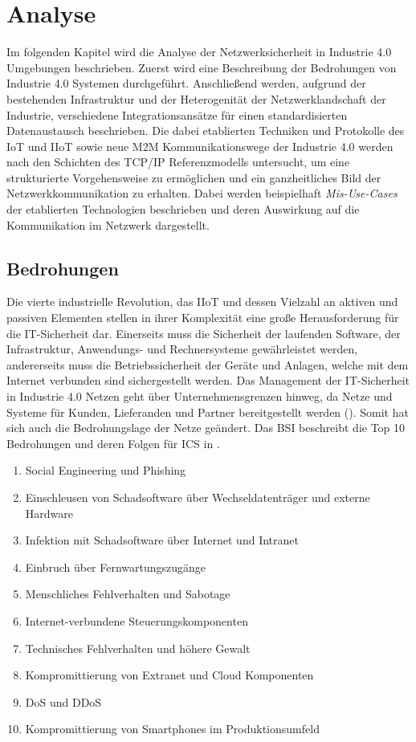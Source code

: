 \chapter{Analyse}
\label{Analyse}
Im folgenden Kapitel wird die Analyse der Netzwerksicherheit in Industrie 4.0 Umgebungen beschrieben. Zuerst wird eine Beschreibung der Bedrohungen von Industrie 4.0 Systemen durchgeführt. Anschließend werden, aufgrund der bestehenden Infrastruktur und der Heterogenität der Netzwerklandschaft der Industrie, verschiedene Integrationsansätze für einen standardisierten Datenaustausch beschrieben. Die dabei etablierten Techniken und Protokolle des \ac{IoT} und \ac{IIoT} sowie neue \ac{M2M} Kommunikationswege der Industrie 4.0 werden nach den Schichten des \ac{TCP}/\ac{IP} Referenzmodells untersucht, um eine strukturierte Vorgehensweise zu ermöglichen und ein ganzheitliches Bild der Netzwerkkommunikation zu erhalten. Dabei werden beispielhaft \textit{Mis-Use-Cases} der etablierten Technologien beschrieben und deren Auswirkung auf die Kommunikation im Netzwerk dargestellt.

\section{Bedrohungen}
\label{Analyse:Bedrohungen}
Die vierte industrielle Revolution, das \ac{IIoT} und dessen Vielzahl an aktiven und passiven Elementen stellen in ihrer Komplexität eine große Herausforderung für die IT-Sicherheit dar. Einerseits muss die Sicherheit der laufenden Software, der Infrastruktur, Anwendungs- und Rechnersysteme gewährleistet werden, andererseits muss die Betriebssicherheit der Geräte und Anlagen, welche mit dem Internet verbunden sind sichergestellt werden. Das Management der IT-Sicherheit in Industrie 4.0 Netzen geht über Unternehmensgrenzen hinweg, da Netze und Systeme für Kunden, Lieferanden und Partner bereitgestellt werden (\cite{DTAG2016}). Somit hat sich auch die Bedrohungslage der Netze geändert. Das \ac{BSI} beschreibt die Top 10 Bedrohungen und deren Folgen für \ac{ICS} in \cite{ICSSec2016}.

\begin{enumerate}
    \item Social Engineering und Phishing
    \item Einschleusen von Schadsoftware über Wechseldatenträger und externe Hardware
    \item Infektion mit Schadsoftware über Internet und Intranet
    \item Einbruch über Fernwartungszugänge
    \item Menschliches Fehlverhalten und Sabotage
    \item Internet-verbundene Steuerungskomponenten
    \item Technisches Fehlverhalten und höhere Gewalt
    \item Kompromittierung von Extranet und Cloud Komponenten
    \item \ac{DoS} und \ac{DDoS}
    \item Kompromittierung von Smartphones im Produktionsumfeld
\end{enumerate}

